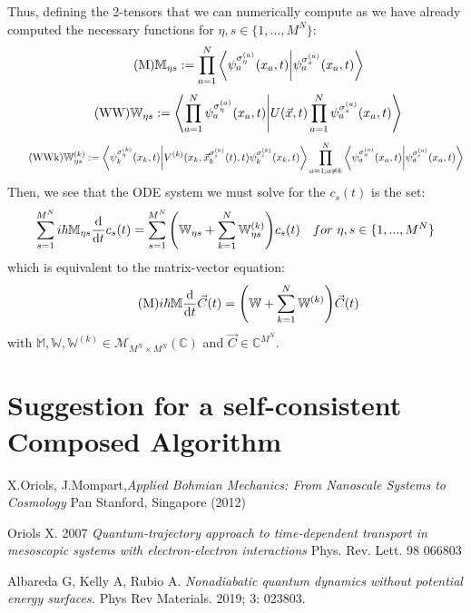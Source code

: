 \documentclass[11pt, a4paper]{article} %
\newcommand{\M}{\mathcal{M}}
\newcommand{\C}{\mathbb{C}}
\begin{document}
Thus, defining the 2-tensors that we can numerically compute as we have already computed the necessary functions for $\eta,s \in \{1,...,M^N \}$:
\begin{equation}\label{M}\tag{M}
\mathbb{M}_{\eta s}:= \prod_{a=1}^N \bra{\psi_a^{\sigma_\eta^{(a)}}(x_a,t)}\ket{\psi_a^{\sigma_s^{(a)}}(x_a,t)}
\end{equation}
\begin{equation}\label{W}\tag{WW}
\mathbb{W}_{\eta s}:=\bra{\prod_{a=1}^N  \psi_a^{\sigma_\eta^{(a)}}(x_a,t)}\ket{U(\vec{x},t)  \prod_{a=1}^N \psi_a^{\sigma_s^{(a)}}(x_a,t)}
\end{equation}
\begin{equation}\label{PDE.c}\tag{WWk}
\mathbb{W}_{\eta s}^{(k)} :=\bra{\psi_k^{\sigma_\eta^{(k)}}(x_k,t)}\ket{V^{(k)}(x_k,\vec{x}_b^{\sigma_s^{(k)}}(t),t) \psi_k^{\sigma_s^{(k)}}(x_k,t)} \prod_{a=1;a\neq k}^N  \bra{\psi_a^{\sigma_\eta^{(a)}}(x_a,t)}\ket{\psi_a^{\sigma_s^{(a)}}(x_a,t)}
\end{equation}
Then, we see that the ODE system we must solve for the $c_s(t)$ is the set:
$$
\sum_{s=1}^{M^N} i\hbar \mathbb{M}_{\eta s} \dv{}{t}c_s(t) = \sum_{s=1}^{M^N} \qty( \mathbb{W}_{\eta s}+\sum_{k=1}^{N} \mathbb{W}^{(k)}_{\eta s})c_s(t) \quad for\ \eta,s \in \{1,...,M^N \}
$$
which is equivalent to the matrix-vector equation:
\begin{equation}\label{M}\tag{M}
i\hbar \mathbb{M} \dv{}{t}\vec{C}(t) =\qty( \mathbb{W}+\sum_{k=1}^{N} \mathbb{W}^{(k)})\vec{C}(t)
\end{equation}
with $\mathbb{M}, \mathbb{W}, \mathbb{W}^{(k)}\in \M_{M^N \times M^N}(\C)$ and $\vec{C}\in \C^{M^N}$.

\section{Suggestion for a self-consistent Composed Algorithm}
\newpage
\begin{thebibliography}{1}

	X.Oriols, J.Mompart,{\em Applied Bohmian Mechanics: From Nanoscale Systems to Cosmology} Pan Stanford, Singapore (2012)
	
	Oriols X. 2007 {\em Quantum-trajectory approach to time-dependent transport in mesoscopic systems with electron-electron interactions} Phys. Rev. Lett. 98 066803

	Albareda G, Kelly A, Rubio A. {\em Nonadiabatic quantum dynamics without potential energy surfaces.} Phys Rev Materials. 2019; 3: 023803. 

	
\end{thebibliography}
\end{document}
